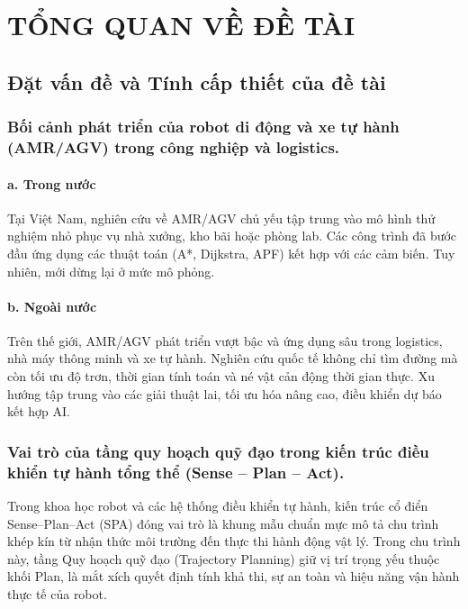 \documentclass[12pt,a4paper,oneside]{report}
\renewcommand{\listfigurename}{Danh mục hình ảnh}
\begin{document}


\tableofcontents
\clearpage
{}
\addcontentsline{toc}{chapter}{\listfigurename}
\listoffigures
\clearpage
{}

\chapter{TỔNG QUAN VỀ ĐỀ TÀI}

\section{Đặt vấn đề và Tính cấp thiết của đề tài}

\subsection{Bối cảnh phát triển của robot di động và xe tự hành (AMR/AGV) trong công nghiệp và logistics.}

\subsubsection*{a. Trong nước}

Tại Việt Nam, nghiên cứu về AMR/AGV chủ yếu tập trung vào mô hình thử nghiệm nhỏ phục vụ nhà xưởng, kho bãi hoặc phòng lab. Các công trình đã bước đầu ứng dụng các thuật toán (A*, Dijkstra, APF) kết hợp với các cảm biến. Tuy nhiên, mới dừng lại ở mức mô phỏng.

\subsubsection*{b. Ngoài nước}

Trên thế giới, AMR/AGV phát triển vượt bậc và ứng dụng sâu trong logistics, nhà máy thông minh và xe tự hành. Nghiên cứu quốc tế không chỉ tìm đường mà còn tối ưu độ trơn, thời gian tính toán và né vật cản động thời gian thực. Xu hướng tập trung vào các giải thuật lai, tối ưu hóa nâng cao, điều khiển dự báo kết hợp AI.

\subsection{Vai trò của tầng quy hoạch quỹ đạo trong kiến trúc điều khiển tự hành tổng thể (Sense – Plan – Act).}

Trong khoa học robot và các hệ thống điều khiển tự hành, kiến trúc cổ điển Sense--Plan--Act (SPA) đóng vai trò là khung mẫu chuẩn mực mô tả chu trình khép kín từ nhận thức môi trường đến thực thi hành động vật lý. Trong chu trình này, tầng Quy hoạch quỹ đạo (Trajectory Planning) giữ vị trí trọng yếu thuộc khối Plan, là mắt xích quyết định tính khả thi, sự an toàn và hiệu năng vận hành thực tế của robot.
\end{document}

